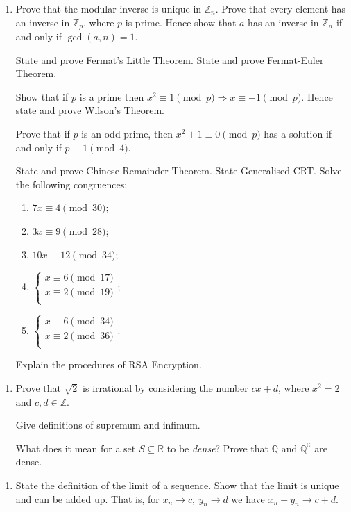 \documentclass[11pt]{article}
\newcommand{\bbZ}{\mathbb{Z}}
\newlength{\qspace}
\newcounter{qnumber}
\newenvironment{question}%
 {\vspace{\qspace}
  \begin{enumerate}[\bfseries 1\quad][10]%
    \setcounter{enumi}{\value{qnumber}}%
    \item%
 }
{
  \end{enumerate}
  \filbreak
  \stepcounter{qnumber}
 }
\begin{document}
\begin{question}
  Prove that the modular inverse is unique in $ \bbZ_n $. Prove that every element has an inverse in $ \bbZ_p $, where $p$ is prime. Hence show that $a$ has an inverse in $ \bbZ_n $ if and only if $ \gcd(a,n)=1 $.

  State and prove Fermat's Little Theorem. State and prove Fermat-Euler Theorem.

  Show that if $p$ is a prime then $ x^2 \equiv 1 \pmod{p} \Rightarrow x \equiv \pm 1 \pmod p $. Hence state and prove Wilson's Theorem.

  Prove that if $p$ is an odd prime, then $ x^2 +1\equiv 0 \pmod p $ has a solution if and only if $ p \equiv 1 \pmod 4 $.

  State and prove Chinese Remainder Theorem. State Generalised CRT. Solve the following congruences:
  \begin{multicols}{3}
    \begin{enumerate}
      \item $ 7x \equiv 4\pmod{30} $;
      \item $ 3x \equiv 9 \pmod{28} $;
      \item $ 10x \equiv 12 \pmod{{34}} $;
      \item $ \begin{cases}
      x \equiv 6 \pmod{17} \\
      x \equiv 2 \pmod{19} \\
      \end{cases}$;
      \item $ \begin{cases}
        x \equiv 6 \pmod{34} \\
        x \equiv 2 \pmod{36} \\
        \end{cases} $.
    \end{enumerate}
  \end{multicols}

  Explain the procedures of RSA Encryption.
\end{question}

\begin{question}
  Prove that $ \sqrt{2} $ is irrational by considering the number $ cx+d $, where $ x^2=2 $ and $c,d\in\bbZ$.

  Give definitions of supremum and infimum.

  What does it mean for a set $ S \subseteq \mathbb{R} $ to be \textit{dense}? Prove that $ \mathbb{Q} $ and $ \mathbb{Q}^\complement $ are dense.
\end{question}

\begin{question}
  State the definition of the limit of a sequence. Show that the limit is unique and can be added up. That is, for $ x_n\to c,\ y_n\to d $ we have $ x_n+y_n\to c+d $.
\end{question}
\end{document}
